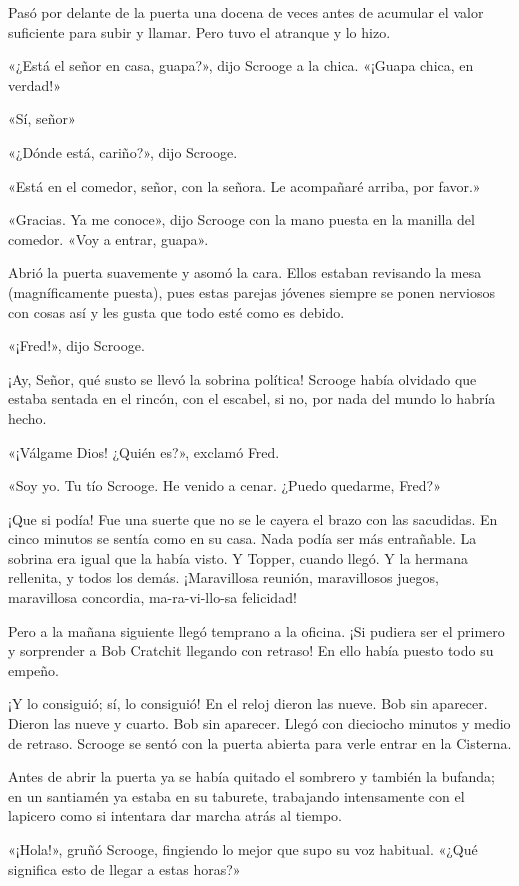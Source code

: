 \documentclass{novela}
\begin{document}
 Pasó por delante de la puerta una docena de veces antes de acumular el valor suficiente para subir y llamar. Pero tuvo el atranque y lo hizo.

 «¿Está el señor en casa, guapa?», dijo Scrooge a la chica. «¡Guapa chica, en verdad!»

 «Sí, señor»

 «¿Dónde está, cariño?», dijo Scrooge.

 «Está en el comedor, señor, con la señora. Le acompañaré arriba, por favor.»

 «Gracias. Ya me conoce», dijo Scrooge con la mano puesta en la manilla del comedor. «Voy a entrar, guapa».

 Abrió la puerta suavemente y asomó la cara. Ellos estaban revisando la mesa (magníficamente puesta), pues estas parejas jóvenes siempre se ponen nerviosos con cosas así y les gusta que todo esté como es debido.

 «¡Fred!», dijo Scrooge.

 ¡Ay, Señor, qué susto se llevó la sobrina política! Scrooge había olvidado que estaba sentada en el rincón, con el escabel, si no, por nada del mundo lo habría hecho.

 «¡Válgame Dios! ¿Quién es?», exclamó Fred.

 «Soy yo. Tu tío Scrooge. He venido a cenar. ¿Puedo quedarme, Fred?»

 ¡Que si podía! Fue una suerte que no se le cayera el brazo con las sacudidas. En cinco minutos se sentía como en su casa. Nada podía ser más entrañable. La sobrina era igual que la había visto. Y Topper, cuando llegó. Y la hermana rellenita, y todos los demás. ¡Maravillosa reunión, maravillosos juegos, maravillosa concordia, ma-ra-vi-llo-sa felicidad!

 Pero a la mañana siguiente llegó temprano a la oficina. ¡Si pudiera ser el primero y sorprender a Bob Cratchit llegando con retraso! En ello había puesto todo su empeño.

 ¡Y lo consiguió; sí, lo consiguió! En el reloj dieron las nueve. Bob sin aparecer. Dieron las nueve y cuarto. Bob sin aparecer. Llegó con dieciocho minutos y medio de retraso. Scrooge se sentó con la puerta abierta para verle entrar en la Cisterna.

 Antes de abrir la puerta ya se había quitado el sombrero y también la bufanda; en un santiamén ya estaba en su taburete, trabajando intensamente con el lapicero como si intentara dar marcha atrás al tiempo.

 «¡Hola!», gruñó Scrooge, fingiendo lo mejor que supo su voz habitual. «¿Qué significa esto de llegar a estas horas?»
\end{document}
